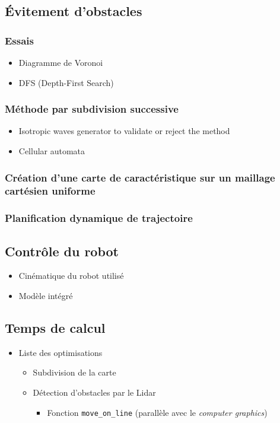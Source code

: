 \documentclass{article}
\numberwithin{figure}{section}
\numberwithin{table}{section}
\begin{document}
\subsection*{Évitement d'obstacles}
\subsubsection*{Essais}
\begin{itemize}
    \item Diagramme de Voronoi
    \item DFS (Depth-First Search)    
\end{itemize}

\subsubsection*{Méthode par subdivision successive}

\begin{itemize}
	\item Isotropic waves generator to validate or reject the method
		\item Cellular automata
\end{itemize}

\subsubsection*{Création d'une carte de caractéristique sur un maillage cartésien uniforme}
\subsubsection*{Planification dynamique de trajectoire}

\subsection*{Contrôle du robot}
\begin{itemize}
    \item Cinématique du robot utilisé
    \item Modèle intégré
\end{itemize}

\subsection*{Temps de calcul}
\begin{itemize}
    \item Liste des optimisations
    \begin{itemize}
        \item Subdivision de la carte
        \item Détection d'obstacles par le Lidar
        \begin{itemize}
            \item Fonction \texttt{move\_on\_line} (parallèle avec le \emph{computer graphics})
        \end{itemize}
    \end{itemize}
\end{itemize}
\end{document}
